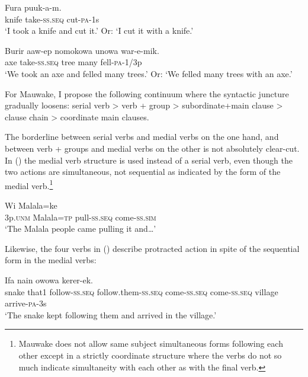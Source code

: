 \ea%
\label{ex:x387}
\gll Fura  puuk-a-m. \\
knife take-\textsc{ss}.\textsc{seq} cut-\textsc{pa}-1s \\
\glt`I took a knife and cut it.' Or: `I cut it with a knife.'
\z

\ea%
\label{ex:x388}
\gll Burir aaw-ep nomokowa unowa war-e-mik. \\
axe take-\textsc{ss}.\textsc{seq} tree many fell-\textsc{pa}-1/3p \\
\glt`We took an axe and felled many trees.' Or: `We felled many trees with an axe.'
\z

For Mauwake, I propose the following continuum where the syntactic juncture gradually loosens: serial verb {{\textgreater}} verb +  group {{\textgreater}} subordinate+main clause {{\textgreater}} clause chain {{\textgreater}} coordinate main clauses.

The borderline between serial verbs and medial verbs on the one hand, and between verb +  groups and medial verbs on the other is not absolutely clear-cut. In () the medial verb structure is used instead of a serial verb, even though the two actions are simultaneous, not sequential as indicated by the form of the medial verb.\footnote{Mauwake does not allow same subject simultaneous forms following each other except in a strictly coordinate structure where the verbs do not so much indicate simultaneity with each other as with the final verb.} 

\ea%
\label{ex:x389}
\gll Wi Malala=ke   \\
3p.\textsc{unm} Malala=\textsc{tp} pull-\textsc{ss}.\textsc{seq} come-\textsc{ss}.\textsc{sim} \\
\glt`The Malala people came pulling it and{\dots}'
\z

Likewise, the four verbs in () describe  protracted action in spite of the sequential form in the medial verbs:

\ea%
\label{ex:x390}
\gll Ifa nain     owowa kerer-ek.\\
snake that1 follow-\textsc{ss}.\textsc{seq} follow.them-\textsc{ss}.\textsc{seq} come-\textsc{ss}.\textsc{seq} come-\textsc{ss}.\textsc{seq} village arrive-\textsc{pa}-3s\\
\glt`The snake kept following them and arrived in the village.'
\z

